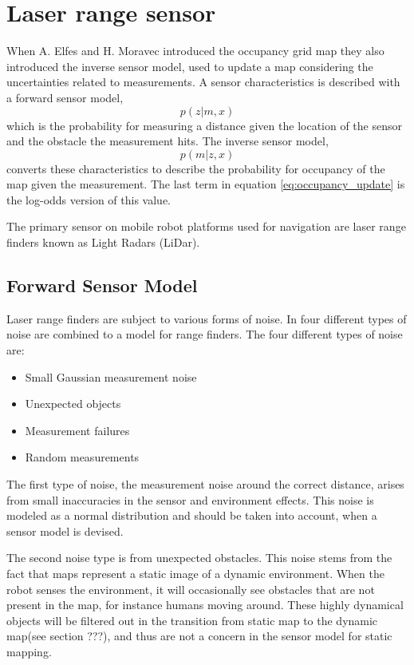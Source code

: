 \section{Laser range sensor}
\label{sec:laser_range_sensor}
When A. Elfes and H. Moravec introduced the occupancy grid map they also introduced the inverse sensor model, used to update a map considering the uncertainties related to measurements. 
A sensor characteristics is described with a forward sensor model, 
\begin{equation*}
	p(z|m,x)
\end{equation*}
which is the probability for measuring a distance given the location of the sensor and the obstacle the measurement hits. 
The inverse sensor model,
\begin{equation*}
	p(m|z,x)
\end{equation*}
converts these characteristics to describe the probability for occupancy of the map given the measurement. The last term in equation \ref{eq:occupancy_update} is the log-odds version of this value.

The primary sensor on mobile robot platforms used for navigation are laser range finders known as Light Radars (LiDar).

\subsection{Forward Sensor Model}
Laser range finders are subject to various forms of noise. In \cite{probRob} four different types of noise are combined to a model for range finders. 
The four different types of noise are:

\begin{itemize}
	\item Small Gaussian measurement noise
	\item Unexpected objects
	\item Measurement failures
	\item Random measurements
\end{itemize}

The first type of noise, the measurement noise around the correct distance, arises from small inaccuracies in the sensor and environment effects. This noise is modeled as a normal distribution and should be taken into account, when a sensor model is devised. 

The second noise type is from unexpected obstacles. This noise stems from the fact that maps represent a static image of a dynamic environment. When the robot senses the environment, it will occasionally see obstacles that are not present in the map, for instance humans moving around. These highly dynamical objects will be filtered out in the transition from static map to the dynamic map(see section ???), and thus are not a concern in the sensor model for static mapping.

